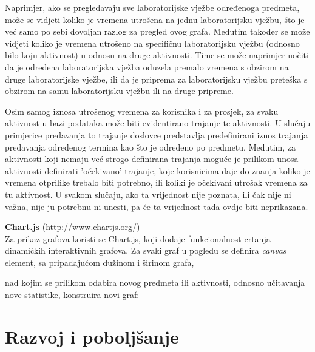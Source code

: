 \documentclass[times, utf8, zavrsni]{fer}
\begin{document}
Naprimjer, ako se pregledavaju sve laboratorijske vježbe određenoga predmeta, može se vidjeti koliko je vremena utrošena na jednu laboratorijsku vježbu, što je već samo po sebi dovoljan razlog za pregled ovog grafa. Međutim također se može vidjeti koliko je vremena utrošeno na specifičnu laboratorijsku vježbu (odnosno bilo koju aktivnost) u odnosu na druge aktivnosti. Time se može naprimjer uočiti da je određena laboratorijska vježba oduzela premalo vremena s obzirom na druge laboratorijske vježbe, ili da je priprema za laboratorijsku vježbu preteška s obzirom na samu laboratorijsku vježbu ili na druge pripreme.

Osim samog iznosa utrošenog vremena za korisnika i za prosjek, za svaku aktivnost u bazi podataka može biti evidentirano trajanje te aktivnosti. U slučaju primjerice predavanja to trajanje doslovce predstavlja predefinirani iznos trajanja predavanja određenog termina kao što je određeno po predmetu. Međutim, za aktivnosti koji nemaju već strogo definirana trajanja moguće je prilikom unosa aktivnosti definirati 'očekivano' trajanje, koje korisnicima daje do znanja koliko je vremena otprilike trebalo biti potrebno, ili koliki je očekivani utrošak vremena za tu aktivnost. U svakom slučaju, ako ta vrijednost nije poznata, ili čak nije ni važna, nije ju potrebnu ni unesti, pa će ta vrijednost tada ovdje biti neprikazana.
\clearpage

\textbf{Chart.js} (http://www.chartjs.org/)\\
Za prikaz grafova koristi se Chart.js, koji dodaje funkcionalnost crtanja dinamičkih interaktivnih grafova. Za svaki graf u pogledu se definira \emph{canvas} element, sa pripadajućom dužinom i širinom grafa,

\lstset{style=html}


nad kojim se prilikom odabira novog predmeta ili aktivnosti, odnosno učitavanja nove statistike, konstruira novi graf:

\lstset{style=js}

\clearpage

\section{Razvoj i poboljšanje}
\end{document}

